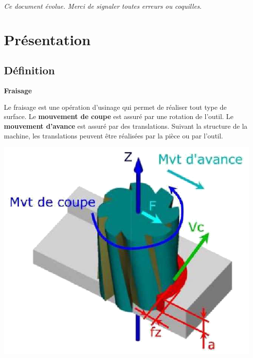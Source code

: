 \documentclass[11pt,oneside]{article}
\begin{document}
\tableofcontents

 \renewcommand{\baselinestretch}{1.2}
\setlength{\parskip}{2ex plus 0.5ex minus 0.2ex}

\textit{Ce document évolue. Merci de signaler toutes erreurs ou coquilles.}

\section{Présentation}

\subsection{Définition}

\begin{defi}
\textbf{Fraisage}

\begin{minipage}[c]{.55\linewidth}
Le fraisage est une opération d'usinage qui permet de réaliser tout type de surface. Le \textbf{mouvement de coupe} est assuré par une rotation de l'outil. Le \textbf{mouvement d'avance} est assuré par des translations. Suivant la structure de la machine, les translations peuvent être réalisées par la pièce ou par l'outil. 
\end{minipage}\hfill
\begin{minipage}[c]{.4\linewidth}
\begin{center}
\includegraphics[width=.95\textwidth]{png/mvt_fraisage}
\end{center}
\end{minipage}
\end{defi}
\end{document}
